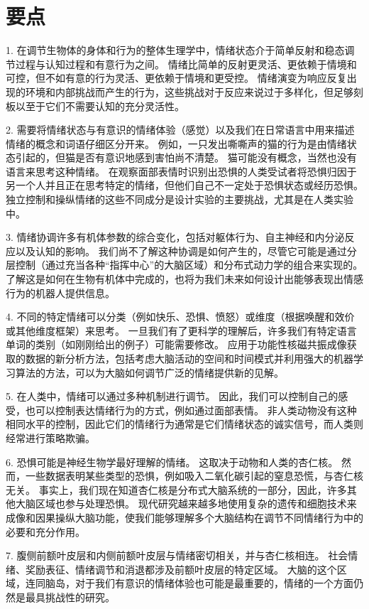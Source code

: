 \section{要点}

1. 在调节生物体的身体和行为的整体生理学中，情绪状态介于简单反射和稳态调节过程与认知过程和有意行为之间。
情绪比简单的反射更灵活、更依赖于情境和可控，但不如有意的行为灵活、更依赖于情境和更受控。
情绪演变为响应反复出现的环境和内部挑战而产生的行为，这些挑战对于反应来说过于多样化，但足够刻板以至于它们不需要认知的充分灵活性。


2. 需要将情绪状态与有意识的情绪体验（感觉）以及我们在日常语言中用来描述情绪的概念和词语仔细区分开来。
例如，一只发出嘶嘶声的猫的行为是由情绪状态引起的，但猫是否有意识地感到害怕尚不清楚。
猫可能没有概念，当然也没有语言来思考这种情绪。
在观察面部表情时识别出恐惧的人类受试者将恐惧归因于另一个人并且正在思考特定的情绪，但他们自己不一定处于恐惧状态或经历恐惧。
独立控制和操纵情绪的这些不同成分是设计实验的主要挑战，尤其是在人类实验中。


3. 情绪协调许多有机体参数的综合变化，包括对躯体行为、自主神经和内分泌反应以及认知的影响。
我们尚不了解这种协调是如何产生的，尽管它可能是通过分层控制（通过充当各种“指挥中心”的大脑区域）和分布式动力学的组合来实现的。
了解这是如何在生物有机体中完成的，也将为我们未来如何设计出能够表现出情感行为的机器人提供信息。


4. 不同的特定情绪可以分类（例如快乐、恐惧、愤怒）或维度（根据唤醒和效价或其他维度框架）来思考。
一旦我们有了更科学的理解后，许多我们有特定语言单词的类别（如刚刚给出的例子）可能需要修改。
应用于功能性核磁共振成像获取的数据的新分析方法，包括考虑大脑活动的空间和时间模式并利用强大的机器学习算法的方法，可以为大脑如何调节广泛的情绪提供新的见解。


5. 在人类中，情绪可以通过多种机制进行调节。
因此，我们可以控制自己的感受，也可以控制表达情绪行为的方式，例如通过面部表情。
非人类动物没有这种相同水平的控制，因此它们的情绪行为通常是它们情绪状态的诚实信号，而人类则经常进行策略欺骗。


6. 恐惧可能是神经生物学最好理解的情绪。
这取决于动物和人类的杏仁核。
然而，一些数据表明某些类型的恐惧，例如吸入二氧化碳引起的窒息恐慌，与杏仁核无关。
事实上，我们现在知道杏仁核是分布式大脑系统的一部分，因此，许多其他大脑区域也参与处理恐惧。
现代研究越来越多地使用复杂的遗传和细胞技术来成像和因果操纵大脑功能，使我们能够理解多个大脑结构在调节不同情绪行为中的必要和充分作用。


7. 腹侧前额叶皮层和内侧前额叶皮层与情绪密切相关，并与杏仁核相连。
社会情绪、奖励表征、情绪调节和消退都涉及前额叶皮层的特定区域。
大脑的这个区域，连同脑岛，对于我们有意识的情绪体验也可能是最重要的，情绪的一个方面仍然是最具挑战性的研究。

